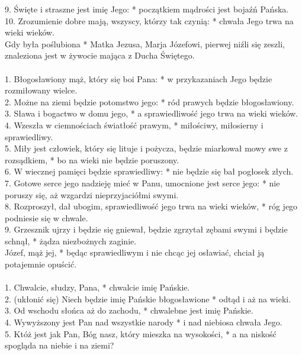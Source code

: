 9. Święte i straszne jest imię Jego: * początkiem mądrości jest bojaźń Pańska.\\
10. Zrozumienie dobre mają, wszyscy, którzy tak czynią: * chwała Jego trwa na wieki wieków.\\
 Gdy była poślubiona * Matka Jezusa, Marja Józefowi, pierwej niźli się zeszli, znaleziona jest w żywocie mająca z Ducha Świętego.\\
\\
1. Błogosławiony mąż, który się boi Pana: * w przykazaniach Jego będzie rozmiłowany wielce.\\
2. Możne na ziemi będzie potomstwo jego: * ród prawych będzie błogosławiony.\\
3. Sława i bogactwo w domu jego, * a sprawiedliwość jego trwa na wieki wieków.\\
4. Wzeszła w ciemnościach światłość prawym, * miłościwy, miłosierny i sprawiedliwy.\\
5. Miły jest człowiek, który się lituje i pożycza, będzie miarkował mowy swe z rozsądkiem, * bo na wieki nie będzie poruszony.\\
6. W wiecznej pamięci będzie sprawiedliwy: * nie będzie się bał pogłosek złych.\\
7. Gotowe serce jego nadzieję mieć w Panu, umocnione jest serce jego: * nie poruszy się, aż wzgardzi nieprzyjaciółmi swymi.\\
8. Rozproszył, dał ubogim, sprawiedliwość jego trwa na wieki wieków, * róg jego podniesie się w chwale.\\
9. Grzesznik ujrzy i będzie się gniewał, będzie zgrzytał zębami swymi i będzie schnął, * żądza niezbożnych zaginie.\\
  Józef, mąż jej, * będąc sprawiedliwym i nie chcąc jej osławiać, chciał ją potajemnie opuścić.\\
\\
1. Chwalcie, słudzy, Pana, * chwalcie imię Pańskie.\\
2. (ukłonić się) Niech będzie imię Pańskie błogosławione * odtąd i aż na wieki.\\
3. Od wschodu słońca aż do zachodu, * chwalebne jest imię Pańskie.\\
4. Wywyższony jest Pan nad wszystkie narody * i nad niebiosa chwała Jego.\\
5. Któż jest jak Pan, Bóg nasz, który mieszka na wysokości, * a na niskość spogląda na niebie i na ziemi?\\
